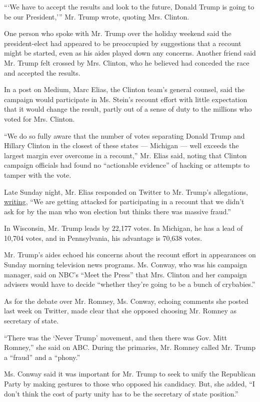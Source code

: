 ```We have to accept the results and look to the future, Donald Trump is
going to be our President,''' Mr. Trump wrote, quoting Mrs. Clinton.

One person who spoke with Mr. Trump over the holiday weekend said the
president-elect had appeared to be preoccupied by suggestions that a
recount might be started, even as his aides played down any concerns.
Another friend said Mr. Trump felt crossed by Mrs. Clinton, who he
believed had conceded the race and accepted the results.

In a post on Medium, Marc Elias, the Clinton team's general counsel,
said the campaign would participate in Ms. Stein's recount effort with
little expectation that it would change the result, partly out of a
sense of duty to the millions who voted for Mrs. Clinton.

``We do so fully aware that the number of votes separating Donald Trump
and Hillary Clinton in the closest of these states --- Michigan --- well
exceeds the largest margin ever overcome in a recount,'' Mr. Elias said,
noting that Clinton campaign officials had found no ``actionable
evidence'' of hacking or attempts to tamper with the vote.

Late Sunday night, Mr. Elias responded on Twitter to Mr. Trump's
allegations,
\href{https://twitter.com/marceelias/status/803071609330397184}{writing},
``We are getting attacked for participating in a recount that we didn't
ask for by the man who won election but thinks there was massive
fraud.''

In Wisconsin, Mr. Trump leads by 22,177 votes. In Michigan, he has a
lead of 10,704 votes, and in Pennsylvania, his advantage is 70,638
votes.

Mr. Trump's aides echoed his concerns about the recount effort in
appearances on Sunday morning television news programs. Ms. Conway, who
was his campaign manager, said on NBC's ``Meet the Press'' that Mrs.
Clinton and her campaign advisers would have to decide ``whether they're
going to be a bunch of crybabies.''

As for the debate over Mr. Romney, Ms. Conway, echoing comments she
posted last week on Twitter, made clear that she opposed choosing Mr.
Romney as secretary of state.

``There was the `Never Trump' movement, and then there was Gov. Mitt
Romney,'' she said on ABC. During the primaries, Mr. Romney called Mr.
Trump a ``fraud'' and a ``phony.''

Ms. Conway said it was important for Mr. Trump to seek to unify the
Republican Party by making gestures to those who opposed his candidacy.
But, she added, ``I don't think the cost of party unity has to be the
secretary of state position.''

